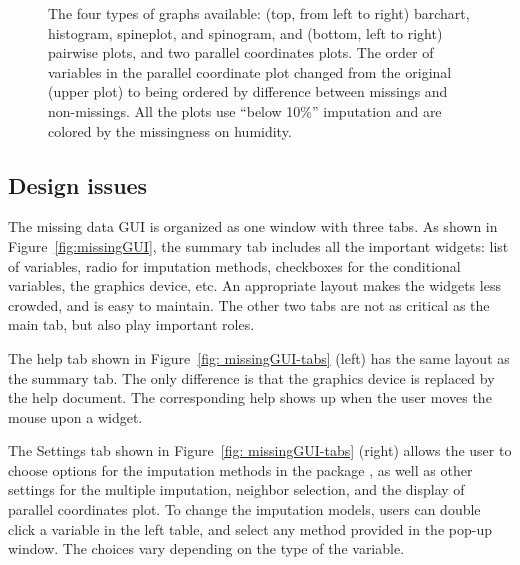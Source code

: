 \documentclass[article]{jss}
\begin{document}
\begin{center}
\begin{figure}[h]
\begin{centering}
\par\end{centering}
\caption{The four types of graphs available: (top, from left to right) barchart, histogram, spineplot, and spinogram, and (bottom, left to right) pairwise plots, and two parallel coordinates plots. The order of variables in the parallel coordinate plot changed from the original (upper plot) to being ordered by difference between missings and non-missings. All the plots use ``below 10\%'' imputation and are colored by the missingness on humidity.}
\label{fig:graphtypes}
\end{figure}
\par\end{center}


\subsection{Design issues}

The missing data GUI is organized as one window with three tabs. As shown in Figure~\ref{fig:missingGUI}, the summary tab includes all the important widgets: list of variables, radio for imputation methods, checkboxes for the conditional variables, the graphics device, etc. An appropriate layout makes the widgets less crowded, and is easy to maintain. The other two tabs are not as critical as the main tab, but also play important roles.

The help tab shown in Figure~\ref{fig: missingGUI-tabs} (left) has the same layout as the summary tab. The only difference is that the graphics device is replaced by the help document. The corresponding help shows up when the user moves the mouse upon a widget.

The Settings tab shown in Figure~\ref{fig: missingGUI-tabs} (right) allows 
the user to choose options for the imputation methods in the 
package , as well as other settings for the multiple 
imputation, neighbor selection, and the display of parallel 
coordinates plot. To change the imputation models, users can double click a 
variable in the left table, and select any method provided in the pop-up window. 
The choices vary depending on the type of the variable.
\end{document}
